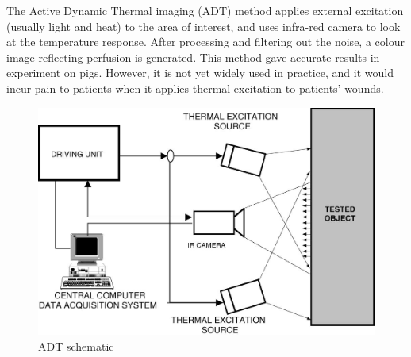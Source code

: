 \documentclass[paper=letter, fontsize=11pt]{scrartcl}
\numberwithin{equation}{section}		%
\numberwithin{figure}{section}			%
\numberwithin{table}{section}			%
\begin{document}
The Active Dynamic Thermal imaging (ADT) method applies external excitation (usually light and heat) to the area of interest, 
and uses infra-red camera to look at the temperature response. After processing and filtering out the noise, a colour image 
reflecting perfusion is generated. This method gave accurate results in experiment on pigs. However, it is not yet widely 
used in practice, and it would incur pain to patients when it applies thermal excitation to patients' wounds. 
\begin{figure}[H]
    \centering
    \begin{minipage}[t]{0.44\textwidth}
        \centering
        \includegraphics[scale=0.3]{ADT_schematic.jpg}
        \caption{ADT schematic}
    \end{minipage}
    \begin{minipage}[t]{0.44\textwidth}
        \centering

\end{minipage}
\end{figure}
\end{document}
